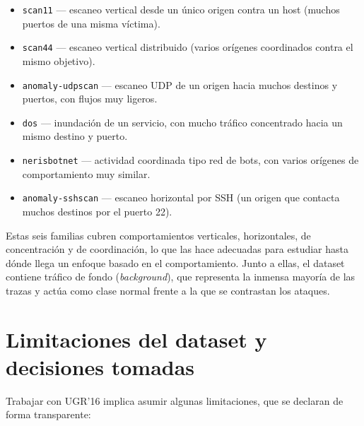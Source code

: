 \begin{itemize}
  \item \texttt{scan11} --- escaneo vertical desde un único origen contra un host (muchos puertos de una misma víctima).
  \item \texttt{scan44} --- escaneo vertical distribuido (varios orígenes coordinados contra el mismo objetivo).
  \item \texttt{anomaly-udpscan} --- escaneo UDP de un origen hacia muchos destinos y puertos, con flujos muy ligeros.
  \item \texttt{dos} --- inundación de un servicio, con mucho tráfico concentrado hacia un mismo destino y puerto.
  \item \texttt{nerisbotnet} --- actividad coordinada tipo red de bots, con varios orígenes de comportamiento muy similar.
  \item \texttt{anomaly-sshscan} --- escaneo horizontal por SSH (un origen que contacta muchos destinos por el puerto 22).
\end{itemize}

Estas seis familias cubren comportamientos verticales, horizontales, de concentración y de coordinación, lo que las hace adecuadas para estudiar hasta dónde llega un enfoque basado en el comportamiento. Junto a ellas, el dataset contiene tráfico de fondo (\emph{background}), que representa la inmensa mayoría de las trazas y actúa como clase normal frente a la que se contrastan los ataques.

\section{Limitaciones del dataset y decisiones tomadas}
\label{sec:herr_limitaciones}

Trabajar con UGR'16 implica asumir algunas limitaciones, que se declaran de forma transparente:

